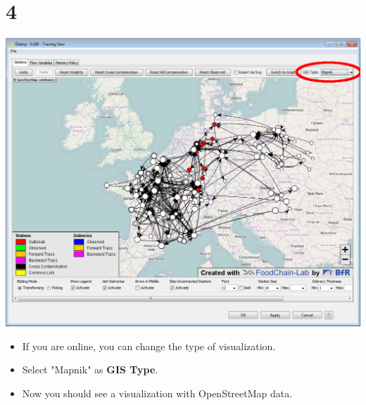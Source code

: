 \documentclass{beamer}
\begin{document}
\section{4}
\begin{frame}
	\begin{center}
  		\includegraphics[height=0.6\textheight]{4.png}
	\end{center}
	\begin{itemize}
		\item If you are online, you can change the type of visualization.
		\item Select "Mapnik" as \textbf{GIS Type}.
		\item Now you should see a visualization with OpenStreetMap data.
	\end{itemize}
\end{frame}
\end{document}
